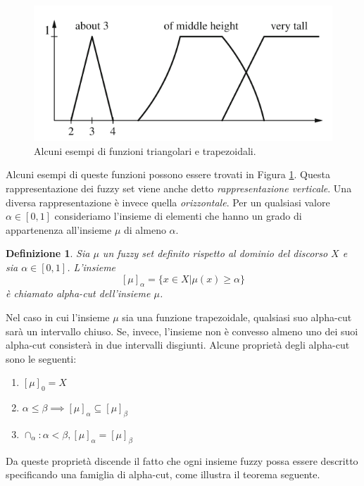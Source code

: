 \documentclass[10pt,a4paper]{article}
\newtheorem{definition}{Definizione}
\begin{document}
\begin{figure}
\centering
\includegraphics[scale=0.4]{img/triang.png}
\caption{Alcuni esempi di funzioni triangolari e trapezoidali.}
\label{fig:24}
\end{figure}

Alcuni esempi di queste funzioni possono essere trovati in Figura \ref{fig:24}. Questa rappresentazione dei fuzzy set viene anche detto \emph{rappresentazione verticale}. Una diversa rappresentazione è invece quella \emph{orizzontale}. Per un qualsiasi valore $\alpha \in [0,1]$ consideriamo l'insieme di elementi che hanno un grado di appartenenza all'insieme $\mu$ di almeno $\alpha$.

\begin{definition}
Sia $\mu$ un fuzzy set definito rispetto al dominio del discorso $X$ e sia $\alpha \in [0,1]$. L'insieme
$$
[\mu]_\alpha = \{x \in X | \mu(x) \geq \alpha \}
$$
è chiamato \emph{alpha-cut} dell'insieme $\mu$.
\end{definition}

Nel caso in cui l'insieme $\mu$ sia una funzione trapezoidale, qualsiasi suo alpha-cut sarà un intervallo chiuso. Se, invece, l'insieme non è convesso almeno uno dei suoi alpha-cut consisterà in due intervalli disgiunti. Alcune proprietà degli alpha-cut sono le seguenti:

\begin{enumerate}
\item{$[\mu]_0 = X$}
\item{$\alpha \leq \beta \implies [\mu]_\alpha \subseteq [\mu]_\beta $}
\item{$\cap_\alpha: \alpha < \beta, [\mu]_\alpha = [\mu]_\beta$}
\end{enumerate} 

Da queste proprietà discende il fatto che ogni insieme fuzzy possa essere descritto specificando una famiglia di alpha-cut, come illustra il teorema seguente.
\end{document}

